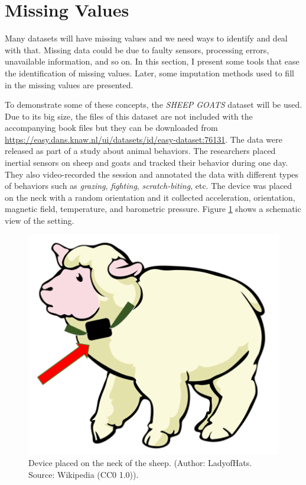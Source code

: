 \documentclass[
  11pt,
]{krantz}
\begin{document}
\hypertarget{missing-values}{%
\section{Missing Values}\label{missing-values}}

Many datasets will have missing values and we need ways to identify and deal with that. Missing data could be due to faulty sensors, processing errors, unavailable information, and so on. In this section, I present some tools that ease the identification of missing values. Later, some imputation methods used to fill in the missing values are presented.

To demonstrate some of these concepts, the \emph{SHEEP GOATS} dataset \citep{kamminga2017} will be used. Due to its big size, the files of this dataset are not included with the accompanying book files but they can be downloaded from \url{https://easy.dans.knaw.nl/ui/datasets/id/easy-dataset:76131}. The data were released as part of a study about animal behaviors. The researchers placed inertial sensors on sheep and goats and tracked their behavior during one day. They also video-recorded the session and annotated the data with different types of behaviors such as \emph{grazing}, \emph{fighting}, \emph{scratch-biting}, etc. The device was placed on the neck with a random orientation and it collected acceleration, orientation, magnetic field, temperature, and barometric pressure. Figure \ref{fig:sheepsensor} shows a schematic view of the setting.



\begin{figure}

{\centering \includegraphics[width=0.5\linewidth]{images/sheep} 

}

\caption{Device placed on the neck of the sheep. (Author: LadyofHats. Source: Wikipedia (CC0 1.0)).}\label{fig:sheepsensor}
\end{figure}
\end{document}
